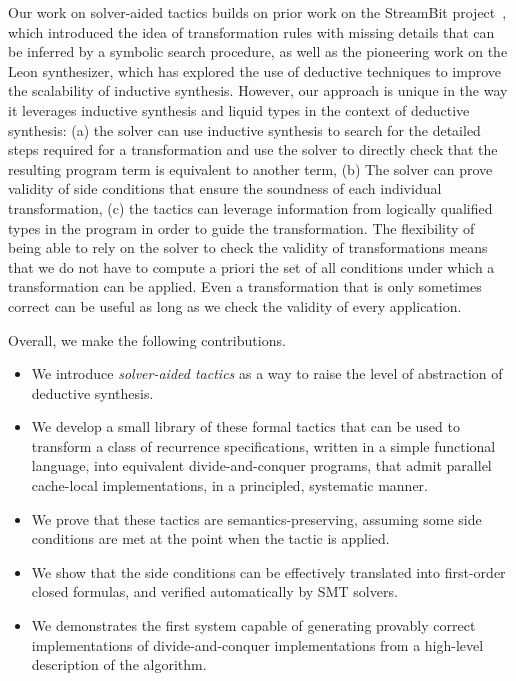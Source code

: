 Our work on solver-aided tactics builds on prior work on the StreamBit project~\cite{PLDI05/Solar-Lezama}, which introduced the idea of transformation rules with missing details that can be inferred by a symbolic search procedure, as well as the pioneering work on the Leon synthesizer, which has explored the use of deductive techniques to improve the scalability of inductive synthesis. However, our approach is unique in the way it leverages inductive synthesis and liquid types in the context of deductive synthesis: (a) the solver can use inductive synthesis to search for the detailed steps required for a transformation and use the solver to directly check that the resulting program term is equivalent to another term, (b) The solver can prove validity of side conditions that ensure the soundness of each individual transformation, (c) the tactics can leverage information from logically qualified types in the program in order to guide the transformation. The flexibility of being able to rely on the solver to check the validity of transformations means that we do not have to compute a priori the set of all conditions under which a transformation can be applied. Even a transformation that is only sometimes correct can be useful as long as we check the validity of every application. 


Overall, we make the following contributions.
\begin{itemize}
\item We introduce \emph{solver-aided tactics} as a way to raise the level of abstraction of deductive synthesis.
\item We develop a small library of these formal tactics that can be used to transform a class of recurrence
  specifications, written in a simple functional language, 
  into equivalent divide-and-conquer programs, that admit parallel cache-local
  implementations, in a principled, systematic manner.
\item We prove that these tactics are semantics-preserving, assuming some side conditions are met
  at the point when the tactic is applied.
  \item We show that the side conditions can be effectively translated into first-order closed
  formulas, and verified automatically by SMT solvers.
\item We demonstrates the first system capable of generating provably correct implementations of divide-and-conquer implementations from a high-level description of the algorithm. 
\end{itemize} 

